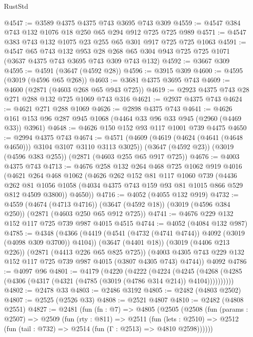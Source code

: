 \begin{lexlean}{RustStd}
\begin{coremodule}
@4547 := @3589 @4375 @4375 @743 @3695 @743 @309
@4559 := @4547 @384 @743 @132 @1076 @18 @250 @65 @294 @912 @725 @725 @989
@4571 := @4547 @383 @743 @132 @1075 @23 @255 @65 @301 @917 @725 @725 @1063
@4591 := @4547
    @65
    @743
    @132
    @953
    @28
    @268
    @65
    @304
    @943
    @725
    @725
    @1071
    (@3637 @4375 @743 @3695 @743 @309 @743 @132)
@4592 := @3667 @309
@4595 := @4591 (@3647 (@4592 @28))
@4596 := @3915 @309
@4600 := @4595 (@3019 (@4596 @65 @268))
@4603 := @3681 @4375 @3695 @743
@4609 := @4600 (@2871 (@4603 @268 @65 @943 @725))
@4619 := @2923 @4375 @743 @28 @271 @288 @132 @725 @1069 @743 @316
@4621 := @2937 @4375 @743
@4624 := @4621 @271 @288 @1069
@4626 := @2898 @4375 @743
@4641 := @4626 @161 @153 @96 @287 @945 @1068 (@4464 @33 @96 @33 @945 (@2960 (@4469 @33)) @3961)
@4648 := @4626 @150 @152 @93 @117 @1001 @739 @4475
@4650 := @2994 @4375 @743
@4674 := @4571
    (@4609 (@4619 (@4624 (@4641 (@4648 @4650))) @3104 @3107 @3110 @3113 @3025))
    (@3647 (@4592 @23))
    (@3019 (@4596 @383 @255))
    (@2871 (@4603 @255 @65 @917 @725))
@4676 := @4003 @4375 @743
@4713 := @4676
    @258
    @132
    @264
    @468
    @725
    @1062
    @919
    @4016
    (@4621
      @264
      @468
      @1062
      (@4626
        @262
        @152
        @81
        @117
        @1060
        @739
        (@4436
          @262
          @81
          @1056
          @1058
          (@4034 @4375 @743 @159 @93 @81 @1015 @866 @529 @812 @4509 @3800))
        @4650))
@4716 := @4052 (@4055 @132 @919)
@4732 := @4559
    (@4674 (@4713 @4716))
    (@3647 (@4592 @18))
    (@3019 (@4596 @384 @250))
    (@2871 (@4603 @250 @65 @912 @725))
@4741 := @4676 @229 @132 @152 @117 @725 @739 @987 @4015 @4515
@4744 := @4052 (@4084 @132 @987)
@4785 := @4348
    (@4366
      (@4419 (@4541 (@4732 (@4741 @4744)) @4092 (@3019 (@4098 @309 @3700)) @4104))
      (@3647 (@4401 @18))
      (@3019 (@4406 @213 @226))
      (@2871 (@4413 @226 @65 @825 @725))
      (@4003 @4305 @743 @229 @132 @152 @117 @725 @739 @987 @4015 (@3807 @4305 @743) @4744))
    @4092
@4786 := @4097 @96
@4801 := @4179
    (@4220
      (@4222
        (@4224
          (@4245 (@4268 (@4285 (@4306 (@4317 (@4321 (@4785 (@3019 (@4786 @314 @214)) @4104))))))))))
@4802 := @2478 @33
@4803 := @2486 @3192
@4805 := @2482 (@4803 @2502)
@4807 := @2525 (@2526 @33)
@4808 := @2521 @4807
@4810 := @2482 (@4808 @2551)
@4827 := @2481
    (fun (fn : @7) =>
    @4805
      (@2505
        (@2508
          (fun (params : @2507) =>
          @2509
            (fun (rty : @811) =>
            @2511
              (fun (lets : @2510) =>
              @2512 (fun (tail : @732) => @2514 (fun (Γ : @2513) => @4810 @2598))))))

\end{coremodule}
\end{lexlean}
